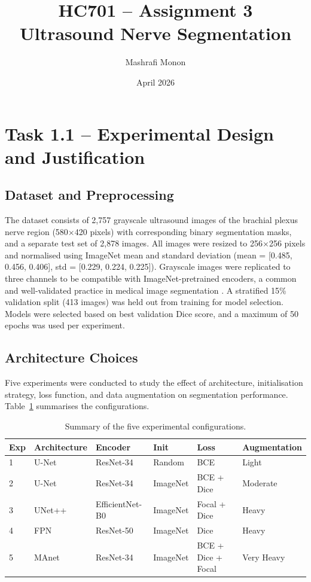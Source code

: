 \documentclass[11pt,a4paper]{article}
\title{\textbf{HC701 -- Assignment 3}\\
Ultrasound Nerve Segmentation}
\author{Mashrafi Monon}
\date{April 2026}
\begin{document}
\maketitle
\tableofcontents
\newpage

\section{Task 1.1 -- Experimental Design and Justification}

\subsection{Dataset and Preprocessing}

The dataset consists of 2,757 grayscale ultrasound images of the brachial plexus nerve region
(580$\times$420 pixels) with corresponding binary segmentation masks, and a separate test set of
2,878 images.
All images were resized to 256$\times$256 pixels and normalised using ImageNet mean
and standard deviation (mean = [0.485, 0.456, 0.406], std = [0.229, 0.224, 0.225]).
Grayscale images were replicated to three channels to be compatible with ImageNet-pretrained
encoders, a common and well-validated practice in medical image segmentation
\cite{ronneberger2015unet}.
A stratified 15\% validation split (413 images) was held out from training for
model selection. Models were selected based on best validation Dice score,
and a maximum of 50 epochs was used per experiment.

\subsection{Architecture Choices}

Five experiments were conducted to study the effect of architecture,
initialisation strategy, loss function, and data augmentation on segmentation performance.
Table~\ref{tab:experiments} summarises the configurations.

\begin{table}[H]
\centering
\caption{Summary of the five experimental configurations.}
\label{tab:experiments}
\begin{tabular}{llllll}
\toprule
\textbf{Exp} & \textbf{Architecture} & \textbf{Encoder} & \textbf{Init} & \textbf{Loss} & \textbf{Augmentation} \\
\midrule
1 & U-Net        & ResNet-34       & Random   & BCE                 & Light   \\
2 & U-Net        & ResNet-34       & ImageNet & BCE + Dice          & Moderate \\
3 & UNet++       & EfficientNet-B0 & ImageNet & Focal + Dice        & Heavy   \\
4 & FPN          & ResNet-50       & ImageNet & Dice                & Heavy   \\
5 & MAnet        & ResNet-34       & ImageNet & BCE + Dice + Focal  & Very Heavy \\
\bottomrule
\end{tabular}
\end{table}
\end{document}
